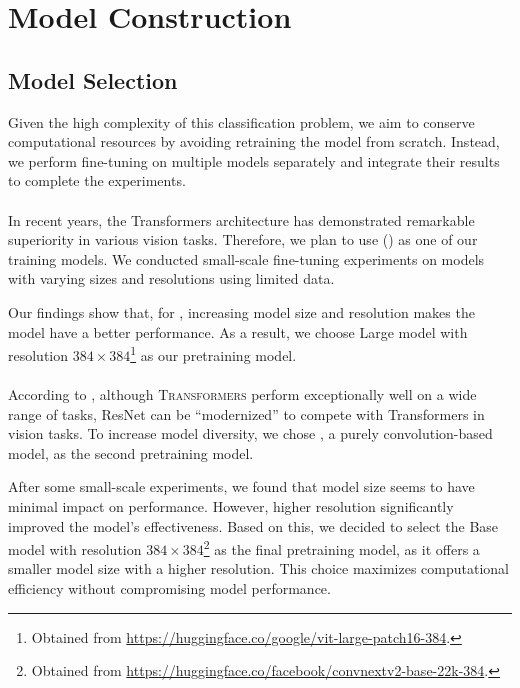    \section{Model Construction}

\subsection{Model Selection}

Given the high complexity of this classification problem, we aim to conserve computational resources by avoiding retraining the model from scratch. Instead, we perform fine-tuning on multiple models separately and integrate their results to complete the experiments.

\paragraph{\VITFULL} In recent years, the Transformers \cite{vaswani2017attention} architecture has demonstrated remarkable superiority in various vision tasks. Therefore, we plan to use \VITFULL (\VIT) \cite{dosovitskiy2020vit} as one of our training models. We conducted small-scale fine-tuning experiments on models with varying sizes and resolutions using limited data. 

Our findings show that, for \VIT, increasing model size and resolution makes the model have a better performance. As a result, we choose \VIT Large model with resolution $384\times 384$\footnote{Obtained from \url{https://huggingface.co/google/vit-large-patch16-384}.} as our pretraining model.

\paragraph{\CONV} According to \cite{liu2022convnet}, although \textsc{Transformers} perform exceptionally well on a wide range of tasks, ResNet \cite{he2016deep} can be ``modernized'' to compete with Transformers in vision tasks. To increase model diversity, we chose \CONV \cite{woo2023convnext}, a purely convolution-based model, as the second pretraining model.

After some small-scale experiments, we found that model size seems to have minimal impact on performance. However, higher resolution significantly improved the model's effectiveness. Based on this, we decided to select the \CONV Base model with resolution $384\times 384$\footnote{Obtained from \url{https://huggingface.co/facebook/convnextv2-base-22k-384}.} as the final pretraining model, as it offers a smaller model size with a higher resolution. This choice maximizes computational efficiency without compromising model performance.

